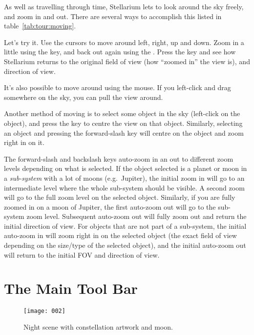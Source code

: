 As well as travelling through time, Stellarium lets to look around the
sky freely, and zoom in and out. There are several ways to accomplish
this listed in table~\ref{tab:tour:moving}.

Let's try it. Use the cursors to move around left, right, up and down.
Zoom in a little using the  key, and back out again using the
. Press the \key{\textbackslash} key and see how Stellarium returns to the
original field of view (how ``zoomed in'' the view is), and direction of
view.

It's also possible to move around using the mouse. If you left-click and
drag somewhere on the sky, you can pull the view around.

Another method of moving is to select some object in the sky (left-click
on the object), and press the  key to centre the view on that
object. Similarly, selecting an object and pressing the forward-slash
key \key{/} will centre on the object and zoom right in on it.

The forward-slash \key{/} and backslash \key{\textbackslash} keys auto-zoom in an out to different
zoom levels depending on what is selected. If the object selected is a planet
or moon in a \emph{sub-system} with a lot of moons (e.g.\ Jupiter), the
initial zoom in will go to an intermediate level where the whole
sub-system should be visible. A second zoom will go to the full zoom
level on the selected object. Similarly, if you are fully zoomed in on a
moon of Jupiter, the first auto-zoom out will go to the sub-system zoom
level. Subsequent auto-zoom out will fully zoom out and return the
initial direction of view. For objects that are not part of a
sub-system, the initial auto-zoom in will zoom right in on the selected
object (the exact field of view depending on the size/type of the
selected object), and the initial auto-zoom out will return to the
initial FOV and direction of view.

\section{The Main Tool Bar}
\label{sec:tour:toolbar}

\begin{figure}[htb]
\centering\texttt{[image: 002]}
\caption{Night scene with constellation artwork and moon.}
\label{fig:002}
\end{figure}

